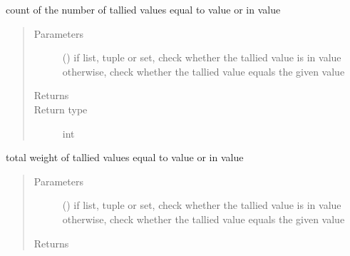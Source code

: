 \documentclass[letterpaper,10pt,english]{sphinxmanual}
\begin{document}
\begin{fulllineitems}
\begin{fulllineitems}
\begin{quote}
\begin{description}
\end{description}\end{quote}

\end{fulllineitems}


\begin{fulllineitems}
\label{\detokenize{Reference:salabim.Monitor.value_number_of_entries}}
count of the number of tallied values equal to value or in value
\begin{quote}\begin{description}
\item[{Parameters}] \leavevmode
{} () \textendash{} if list, tuple or set, check whether the tallied value is in value 
otherwise, check whether the tallied value equals the given value

\item[{Returns}] \leavevmode
{}

\item[{Return type}] \leavevmode
int

\end{description}\end{quote}

\end{fulllineitems}


\begin{fulllineitems}
\label{\detokenize{Reference:salabim.Monitor.value_weight}}
total weight of tallied values equal to value or in value
\begin{quote}\begin{description}
\item[{Parameters}] \leavevmode
{} () \textendash{} if list, tuple or set, check whether the tallied value is in value 
otherwise, check whether the tallied value equals the given value

\item[{Returns}] \leavevmode
{}


\end{description}
\end{quote}
\end{fulllineitems}
\end{fulllineitems}
\end{document}

